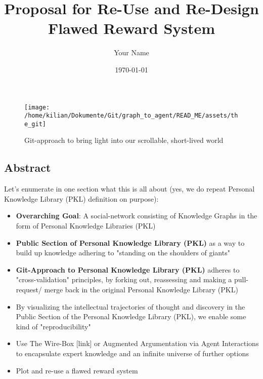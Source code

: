 \documentclass[11pt, a4paper]{article}
\begin{document}
    \title{\color{gitred}Proposal for Re-Use and Re-Design Flawed Reward System}
    \author{\color{gitgreen}Your Name}
    \date{\color{gitorange}\today}
    \maketitle

    \tableofcontents
    \newpage
    \begin{figure}
        \centering
        \texttt{[image: /home/kilian/Dokumente/Git/graph\_to\_agent/READ\_ME/assets/the\_git]}
        \caption[Beacon of Git]{Git-approach to bring light into our scrollable, short-lived world}
        \label{fig:}
    \end{figure}



    \begin{gitbox}
        \section*{Abstract}
        Let's enumerate in one section what this is all about (yes, we do repeat Personal Knowledge Library (PKL) definition on purpose):

        \begin{itemize}
            \item \textbf{Overarching Goal}: A social-network consisting of Knowledge Graphs in the form of Personal Knowledge Libraries (PKL)
            \item \textbf{Public Section of Personal Knowledge Library (PKL)} as a way to build up knowledge adhering to "standing on the shoulders of giants"
            \item \textbf{Git-Approach to Personal Knowledge Library (PKL)} adheres to "cross-validation" principles, by forking out, reassessing and making a pull-request/ merge back in the original Personal Knowledge Library (PKL)
            \item By visualizing the intellectual trajectories of thought and discovery in the Public Section of the Personal Knowledge Library (PKL), we enable some kind of "reproducibility"
            \item Use The Wire-Box [link] or Augmented Argumentation via Agent Interactions to encapsulate expert knowledge and an infinite universe of further options
            \item Plot and re-use a flawed reward system
        \end{itemize}
    \end{gitbox}
\end{document}
